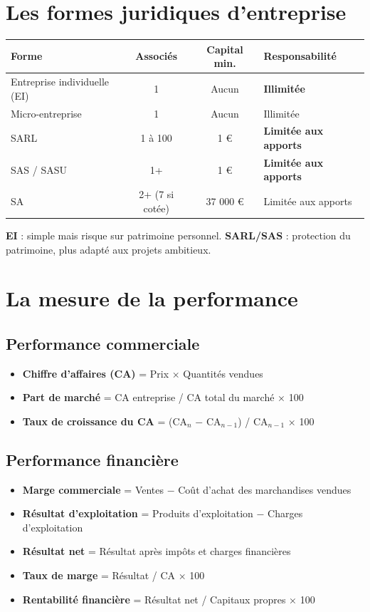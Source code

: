 \documentclass[11pt,a4paper]{article}
\begin{document}
\section*{Les formes juridiques d'entreprise}

\begin{center}
\begin{tabular}{|l|c|c|l|}
\hline
\textbf{Forme} & \textbf{Associés} & \textbf{Capital min.} & \textbf{Responsabilité} \\
\hline
Entreprise individuelle (EI) & 1 & Aucun & \textbf{Illimitée} \\
Micro-entreprise & 1 & Aucun & Illimitée \\
SARL & 1 à 100 & 1 € & \textbf{Limitée aux apports} \\
SAS / SASU & 1+ & 1 € & \textbf{Limitée aux apports} \\
SA & 2+ (7 si cotée) & 37 000 € & Limitée aux apports \\
\hline
\end{tabular}
\end{center}

\begin{keybox}
\textbf{EI} : simple mais risque sur patrimoine personnel. \textbf{SARL/SAS} : protection du patrimoine, plus adapté aux projets ambitieux.
\end{keybox}

\section*{La mesure de la performance}

\subsection*{Performance commerciale}
\begin{itemize}
  \item \textbf{Chiffre d'affaires (CA)} = Prix × Quantités vendues
  \item \textbf{Part de marché} = CA entreprise / CA total du marché × 100
  \item \textbf{Taux de croissance du CA} = (CA$_n$ $-$ CA$_{n-1}$) / CA$_{n-1}$ × 100
\end{itemize}

\subsection*{Performance financière}
\begin{itemize}
  \item \textbf{Marge commerciale} = Ventes $-$ Coût d'achat des marchandises vendues
  \item \textbf{Résultat d'exploitation} = Produits d'exploitation $-$ Charges d'exploitation
  \item \textbf{Résultat net} = Résultat après impôts et charges financières
  \item \textbf{Taux de marge} = Résultat / CA × 100
  \item \textbf{Rentabilité financière} = Résultat net / Capitaux propres × 100
\end{itemize}
\end{document}
